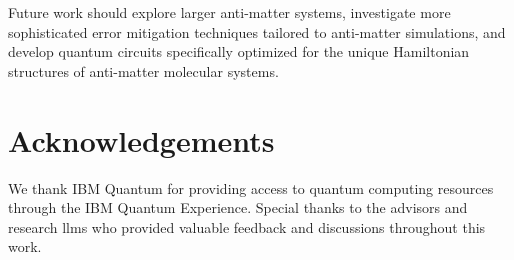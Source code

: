 \documentclass[10pt,twocolumn,a4paper]{article}
\begin{document}
Future work should explore larger anti-matter systems, investigate more sophisticated error mitigation techniques tailored to anti-matter simulations, and develop quantum circuits specifically optimized for the unique Hamiltonian structures of anti-matter molecular systems.

\section{Acknowledgements}
We thank IBM Quantum for providing access to quantum computing resources through the IBM Quantum Experience. Special thanks to the advisors and research llms who provided valuable feedback and discussions throughout this work.



\end{document}
